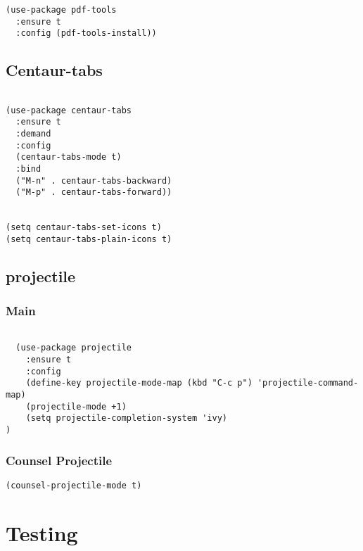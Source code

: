 \documentclass[11pt]{article}
\begin{document}
\begin{verbatim}
(use-package pdf-tools
  :ensure t
  :config (pdf-tools-install))
\end{verbatim}

\subsection{Centaur-tabs}
\label{sec:org572e9a9}

\begin{verbatim}

(use-package centaur-tabs
  :ensure t
  :demand
  :config
  (centaur-tabs-mode t)
  :bind
  ("M-n" . centaur-tabs-backward)
  ("M-p" . centaur-tabs-forward))


(setq centaur-tabs-set-icons t)
(setq centaur-tabs-plain-icons t)
\end{verbatim}

\subsection{projectile}
\label{sec:org57a66aa}
\subsubsection{Main}
\label{sec:orgf3215f3}
\begin{verbatim}

  (use-package projectile
    :ensure t
    :config
    (define-key projectile-mode-map (kbd "C-c p") 'projectile-command-map)
    (projectile-mode +1)
    (setq projectile-completion-system 'ivy)
)
\end{verbatim}
\subsubsection{Counsel Projectile}
\label{sec:orgda1db83}


\begin{verbatim}
(counsel-projectile-mode t)
\end{verbatim}
\section{Testing}
\label{sec:org08612ac}
\end{document}
